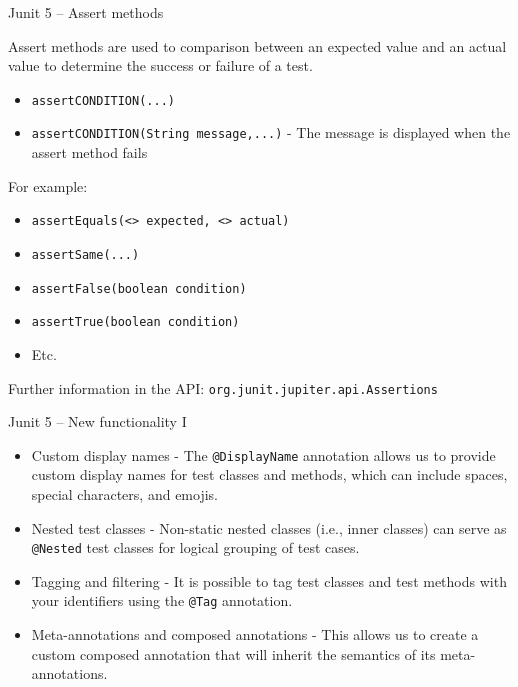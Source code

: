 \documentclass[11pt, xcolor=svgnames]{beamer}
\begin{document}

\begin{frame}{Junit 5 -- Assert methods}

Assert methods are used to comparison between an expected value and an actual value to determine the success or failure of a test.
  
      \begin{itemize}
        \item \texttt{assertCONDITION(...)}
        \item \texttt{assertCONDITION(String message,...)} - The message is displayed when the assert method fails
      \end{itemize}
  
For example:

      \begin{itemize}
        \item \texttt{assertEquals(<> expected, <> actual)}
        \item \texttt{assertSame(...)} 
        \item \texttt{assertFalse(boolean condition)}
        \item \texttt{assertTrue(boolean condition)}
        \item Etc.
      \end{itemize}

Further information in the API: \texttt{org.junit.jupiter.api.Assertions}

  
\end{frame}


\begin{frame}{Junit 5 -- New functionality I}

  \begin{itemize}
    \item Custom display names - The \texttt{@DisplayName} annotation allows us to provide custom display names for test classes and methods, which can include spaces, special characters, and emojis.
  
    \item Nested test classes - Non-static nested classes (i.e., inner classes) can serve as \texttt{@Nested} test classes for logical grouping of test cases. 
  
    \item Tagging and filtering - It is possible to tag test classes and test methods with your identifiers using the \texttt{@Tag} annotation. 
  
    \item Meta-annotations and composed annotations - This allows us to create a custom composed annotation that will inherit the semantics of its meta-annotations.
  \end{itemize}

\end{frame}
\end{document}
